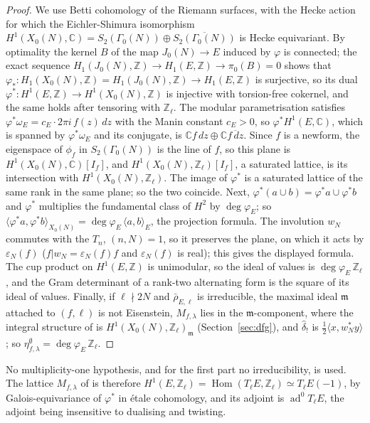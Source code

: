 \documentclass[11pt]{amsart}
\theoremstyle{definition}
\newcommand{\Z}{\mathbb{Z}}
\newcommand{\C}{\mathbb{C}}
\newcommand{\degphi}{\deg\varphi_E}
\newcommand{\ad}{\operatorname{ad}^0}
\begin{document}
\begin{proof}
We use Betti cohomology of the Riemann surfaces, with the Hecke action for which the Eichler-Shimura isomorphism $H^1(X_0(N),\C)=S_2(\Gamma_0(N))\oplus\overline{S_2(\Gamma_0(N))}$ is Hecke equivariant. By optimality the kernel $B$ of the map $J_0(N)\to E$ induced by $\varphi$ is connected; the exact sequence $H_1(J_0(N),\Z)\to H_1(E,\Z)\to\pi_0(B)=0$ shows that $\varphi_*\colon H_1(X_0(N),\Z)=H_1(J_0(N),\Z)\to H_1(E,\Z)$ is surjective, so its dual $\varphi^*\colon H^1(E,\Z)\to H^1(X_0(N),\Z)$ is injective with torsion-free cokernel, and the same holds after tensoring with $\Z_\ell$. The modular parametrisation satisfies $\varphi^*\omega_E=c_E\cdot2\pi i\,f(z)\,dz$ with the Manin constant $c_E>0$, so $\varphi^*H^1(E,\C)$, which is spanned by $\varphi^*\omega_E$ and its conjugate, is $\C f\,dz\oplus\C\overline{f\,dz}$. Since $f$ is a newform, the eigenspace of $\phi_f$ in $S_2(\Gamma_0(N))$ is the line of $f$, so this plane is $H^1(X_0(N),\C)[I_f]$, and $H^1(X_0(N),\Z_\ell)[I_f]$, a saturated lattice, is its intersection with $H^1(X_0(N),\Z_\ell)$. The image of $\varphi^*$ is a saturated lattice of the same rank in the same plane; so the two coincide. Next, $\varphi^*(a\cup b)=\varphi^*a\cup\varphi^*b$ and $\varphi^*$ multiplies the fundamental class of $H^2$ by $\degphi$; so $\langle\varphi^*a,\varphi^*b\rangle_{X_0(N)}=\degphi\,\langle a,b\rangle_E$, the projection formula. The involution $w_N$ commutes with the $T_n$, $(n,N)=1$, so it preserves the plane, on which it acts by $\varepsilon_N(f)$ ($f|w_N=\varepsilon_N(f)f$ and $\varepsilon_N(f)$ is real); this gives the displayed formula. The cup product on $H^1(E,\Z)$ is unimodular, so the ideal of values is $\degphi\,\Z_\ell$, and the Gram determinant of a rank-two alternating form is the square of its ideal of values. Finally, if $\ell\nmid2N$ and $\bar\rho_{E,\ell}$ is irreducible, the maximal ideal $\mathfrak m$ attached to $(f,\ell)$ is not Eisenstein, $M_{f,\lambda}$ lies in the $\mathfrak m$-component, where the integral structure of \cite{DFG04} is $H^1(X_0(N),\Z_\ell)_{\mathfrak m}$ (Section~\ref{sec:dfg}), and $\hat\delta_!$ is $\frac12\langle x,w_N^*y\rangle$; so $\eta^\emptyset_{f,\lambda}=\degphi\,\Z_\ell$.
\end{proof}

No multiplicity-one hypothesis, and for the first part no irreducibility, is used. The lattice $M_{f,\lambda}$ of \cite{DFG04} is therefore $H^1(E,\Z_\ell)=\operatorname{Hom}(T_\ell E,\Z_\ell)\simeq T_\ell E(-1)$, by Galois-equivariance of $\varphi^*$ in \'etale cohomology, and its adjoint is $\ad T_\ell E$, the adjoint being insensitive to dualising and twisting.
\end{document}
